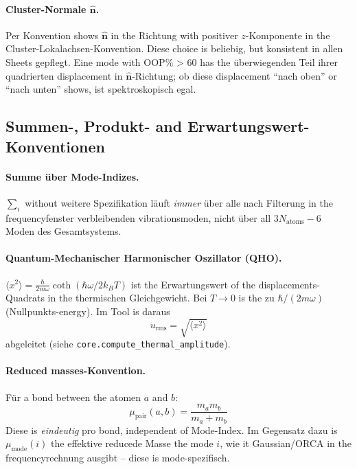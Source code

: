 \documentclass[11pt,a4paper,twoside]{article}
\theoremstyle{remark}
\begin{document}
\paragraph{Cluster-Normale $\hat{\mathbf{n}}$.}
Per Konvention shows $\hat{\mathbf{n}}$ in the Richtung with positiver
$z$-Komponente in the Cluster-Lokalachsen-Konvention. Diese
choice is beliebig, but konsistent in allen Sheets gepflegt.
Eine mode with OOP\% > 60 has the \"uberwiegenden Teil ihrer
quadrierten displacement in $\hat{\mathbf{n}}$-Richtung; ob diese
displacement "`nach oben"' or "`nach unten"' shows, ist
spektroskopisch egal.

\subsection{Summen-, Produkt- and Erwartungswert-Konventionen}

\paragraph{Summe \"uber Mode-Indizes.}
$\sum_i$ without weitere Spezifikation l\"auft \emph{immer} \"uber alle
nach Filterung in the frequencyfenster verbleibenden vibrationsmoden,
nicht \"uber all $3N_\text{atoms} - 6$ Moden des
Gesamtsystems.

\paragraph{Quantum-Mechanischer Harmonischer Oszillator (QHO).}
$\langle x^2 \rangle = \frac{\hbar}{2 m \omega}\coth(\hbar\omega/2k_BT)$
ist the Erwartungswert of the displacements-Quadrats in the thermischen
Gleichgewicht. Bei $T \to 0$ is the zu $\hbar/(2m\omega)$
(Nullpunkts-energy). Im Tool is daraus
\begin{equation}
  u_\text{rms} = \sqrt{\langle x^2\rangle}
\end{equation}
abgeleitet (siehe \texttt{core.compute\_thermal\_amplitude}).

\paragraph{Reduced masses-Konvention.}
F\"ur a bond between the atomen $a$ and $b$:
\begin{equation}
  \mu_\text{pair}(a, b) = \frac{m_a m_b}{m_a + m_b}
\end{equation}
Diese is \emph{eindeutig} pro bond, independent of Mode-Index.
Im Gegensatz dazu is $\mu_\text{mode}(i)$ the effektive reducede
Masse the mode $i$, wie it Gaussian/ORCA in the frequencyrechnung
ausgibt -- diese is mode-spezifisch.
\end{document}
